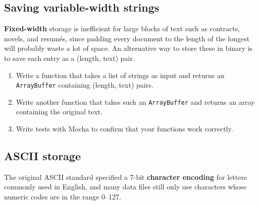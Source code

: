 \documentclass[krantzl]{krantz}
\newcommand{\glossref}[1]{\textbf{#1}}
\begin{document}
\subsection*{Saving variable-width strings}


\glossref{Fixed-width} storage is inefficient for large blocks of text
such as contracts, novels, and resumés,
since padding every document to the length of the longest will probably waste a lot of space.
An alternative way to store these in binary is to save each entry as a (length, text) pair.

\begin{enumerate}

\item 

Write a function that takes a list of strings as input
    and returns an \texttt{ArrayBuffer} containing (length, text) pairs.



\item 

Write another function that takes such an \texttt{ArrayBuffer}
    and returns an array containing the original text.



\item 

Write tests with Mocha to confirm that your functions work correctly.



\end{enumerate}

\subsection*{ASCII storage}


The original ASCII standard specified
a 7-bit \glossref{character encoding} for letters commonly used in English,
and many data files still only use characters whose numeric codes are in the range 0--127.
\end{document}
